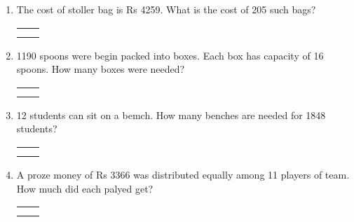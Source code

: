 \begin{enumerate}
    \item The cost of stoller bag is Rs 4259. What is the cost of 205 such bags?

    \begin{myTableStyle} \begin{tabular}{ |m{10cm}|m{3cm}| } \hline
        &  \\\hline
        &  \\\hline
        \multicolumn{2}{|c|}{} \\\hline
    \end{tabular} \end{myTableStyle} \vspace{0.08in}

    \item 1190 spoons were begin packed into boxes. Each box has capacity of 16 spoons. How many
        boxes were needed?

    \begin{myTableStyle} \begin{tabular}{ |m{10cm}|m{3cm}| } \hline
        &  \\\hline
        &  \\\hline
        \multicolumn{2}{|c|}{} \\\hline
    \end{tabular} \end{myTableStyle} \vspace{0.08in}

    \item 12 students can sit on a bemch. How many benches are needed for 1848 students?

    \begin{myTableStyle} \begin{tabular}{ |m{10cm}|m{3cm}| } \hline
        &  \\\hline
        &  \\\hline
        \multicolumn{2}{|c|}{} \\\hline
    \end{tabular} \end{myTableStyle} \vspace{0.08in}

    \item A proze money of Rs 3366 was distributed equally among 11 players of team. How much did each palyed get?

    \begin{myTableStyle} \begin{tabular}{ |m{10cm}|m{3cm}| } \hline
        &  \\\hline
        &  \\\hline
        \multicolumn{2}{|c|}{} \\\hline
    \end{tabular} \end{myTableStyle} \vspace{0.08in}


\end{enumerate}
